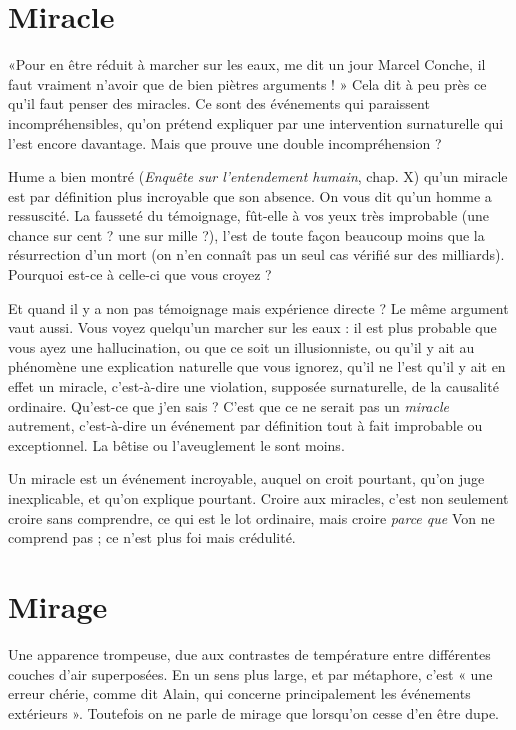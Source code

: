\section{Miracle}
«Pour en être réduit à marcher sur les eaux, me dit un jour
Marcel Conche, il faut vraiment n'avoir que de bien piètres
arguments ! » Cela dit à peu près ce qu’il faut penser des miracles. Ce sont des
événements qui paraissent incompréhensibles, qu’on prétend expliquer par une
intervention surnaturelle qui l’est encore davantage. Mais que prouve une
double incompréhension ?

Hume a bien montré ({\it Enquête sur l'entendement humain}, chap. X) qu’un
miracle est par définition plus incroyable que son absence. On vous dit qu’un
homme a ressuscité. La fausseté du témoignage, fût-elle à vos yeux très improbable
(une chance sur cent ? une sur mille ?), l’est de toute façon beaucoup
moins que la résurrection d’un mort (on n’en connaît pas un seul cas vérifié sur
des milliards). Pourquoi est-ce à celle-ci que vous croyez ?

Et quand il y a non pas témoignage mais expérience directe ? Le même
argument vaut aussi. Vous voyez quelqu'un marcher sur les eaux : il est plus
probable que vous ayez une hallucination, ou que ce soit un illusionniste, ou
qu'il y ait au phénomène une explication naturelle que vous ignorez, qu’il ne
l’est qu’il y ait en effet un miracle, c’est-à-dire une violation, supposée surnaturelle,
de la causalité ordinaire. Qu'est-ce que j’en sais ? C’est que ce ne serait pas
un {\it miracle} autrement, c’est-à-dire un événement par définition tout à fait
improbable ou exceptionnel. La bêtise ou l’aveuglement le sont moins.

Un miracle est un événement incroyable, auquel on croit pourtant, qu’on
juge inexplicable, et qu’on explique pourtant. Croire aux miracles, c’est non
seulement croire sans comprendre, ce qui est le lot ordinaire, mais croire {\it parce
que} Von ne comprend pas ; ce n’est plus foi mais crédulité.

\section{Mirage}
Une apparence trompeuse, due aux contrastes de température
entre différentes couches d’air superposées. En un sens plus large,
et par métaphore, c’est « une erreur chérie, comme dit Alain, qui concerne
principalement les événements extérieurs ». Toutefois on ne parle de mirage
que lorsqu'on cesse d’en être dupe.

